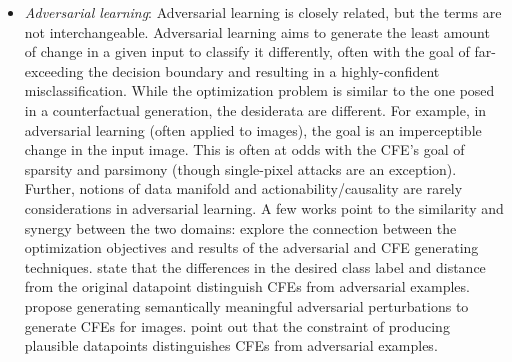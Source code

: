 \begin{itemize}[leftmargin=*]
    \item \emph{Adversarial learning}: Adversarial learning is closely related, but the terms are not interchangeable. Adversarial learning aims to generate the least amount of change in a given input to classify it differently, often with the goal of far-exceeding the decision boundary and resulting in a highly-confident misclassification. While the optimization problem is similar to the one posed in a counterfactual generation, the desiderata are different. For example, in adversarial learning (often applied to images), the goal is an imperceptible change in the input image. This is often at odds with the CFE's goal of sparsity and parsimony (though single-pixel attacks are an exception). Further, notions of data manifold and actionability/causality are rarely considerations in adversarial learning. A few works point to the similarity and synergy between the two domains: 
    \citet{pawelczyk2021_CFE_AE_connection} explore the connection between the optimization objectives and results of the adversarial and CFE generating techniques.
    \citet{freiesleben2020CFE_AE1} state that the differences in the desired class label and distance from the original datapoint distinguish CFEs from adversarial examples.
    \citet{Elliott2021_adversarial_cfe_images} propose generating semantically meaningful adversarial perturbations to generate CFEs for images. 
    \citet{semantic-explanation_adversarial_cfe_diff} point out that the constraint of producing plausible datapoints distinguishes CFEs from adversarial examples. 
      
\end{itemize}

 